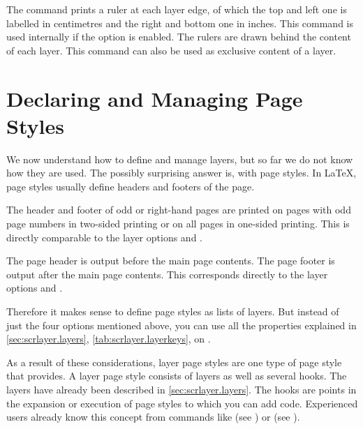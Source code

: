 \begin{Declaration}
\end{Declaration}
The  command prints a ruler at each layer edge, of
which the top and left one is labelled in centimetres and the right and bottom
one in inches. This command is used internally if the
 option is enabled. The
rulers are drawn behind the content of each layer. This command can also be
used as exclusive content of a layer.%
\EndIndexGroup


\section{Declaring and Managing Page Styles}

\BeginIndexGroup
{}%
We now understand how to define and manage layers, but so far we do not know 
how they are used. The possibly surprising answer is, with page styles. In
\LaTeX{}, page styles usually define headers and footers of the page.

The header and footer of odd or right-hand pages
are printed on pages with odd page numbers in two-sided printing or on all
pages in one-sided printing. This is directly comparable to the layer 
options  and
.

The page header is output before the main page
contents. The page footer is output after the main page contents. This
corresponds directly to the layer
options
 and .

Therefore it makes sense to define page styles as lists of layers. But instead
of just the four options mentioned above, you can use all the properties
explained in \autoref{sec:scrlayer.layers}, \autoref{tab:scrlayer.layerkeys}, 
on .

As a result of these considerations, layer page
styles%
 are one type of page style that 
 provides. A layer page style consists of layers as well as
several hooks. The layers have already been described in
\autoref{sec:scrlayer.layers}. The hooks%
 are points in the expansion or execution of page styles to
which you can add code. Experienced users already know this concept from
commands like  (see \cite{latex:usrguide}) or
 (see
).

